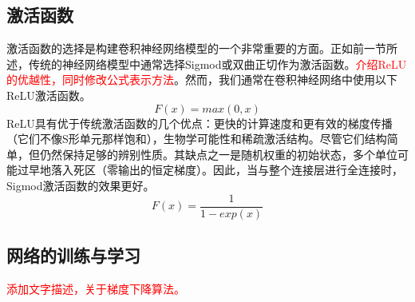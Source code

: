 \subsection{激活函数}
激活函数的选择是构建卷积神经网络模型的一个非常重要的方面。正如前一节所述，传统的神经网络模型中通常选择Sigmod或双曲正切作为激活函数。\textcolor{red}{介绍ReLU的优越性，同时修改公式表示方法}。然而，我们通常在卷积神经网络中使用以下ReLU激活函数。
\begin{equation}
F(x) = max (0, x)
\end{equation}
ReLU具有优于传统激活函数的几个优点：更快的计算速度和更有效的梯度传播（它们不像S形单元那样饱和），生物学可能性和稀疏激活结构。尽管它们结构简单，但仍然保持足够的辨别性质。其缺点之一是随机权重的初始状态，多个单位可能过早地落入死区（零输出的恒定梯度）。因此，当与整个连接层进行全连接时，Sigmod激活函数的效果更好。
\begin{equation}
F(x) = \frac{1}{1-exp(x)}
\end{equation}
\subsection{网络的训练与学习}
\textcolor{red}{添加文字描述，关于梯度下降算法。}

